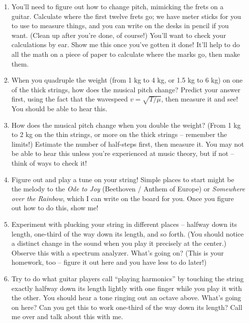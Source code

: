 \documentclass[12pt]{article}
\begin{document}
\begin{enumerate}


\item You'll need to figure out how to change pitch, mimicking the frets on a guitar. Calculate where the first twelve frets go; we have meter sticks for you to use
to measure things, and you can write on the desks in pencil if you want. (Clean up after you're done, of course!) You'll want to check your calculations by ear.
Show me this once you've gotten it done! It'll help to do all the math on a piece of paper to calculate where the marks go, then make them.


\item When you quadruple the weight (from 1 kg to 4 kg, or 1.5 kg to 6 kg) on one of the thick strings, how does the musical pitch change? Predict your answer first,
using the fact that the wavespeed $v=\sqrt{T/\mu}$, then measure it and see! You should be able to hear this.


\item How does the musical pitch change when you double the weight? (From 1 kg to 2 kg on the thin strings, or more on the thick strings -- remember the limits!)
Estimate the number of half-steps first, then measure it. You may not be able to hear this unless you're experienced at music theory, but if not -- think of ways to
check it!

\item Figure out and play a tune on your string! Simple places to start might be the melody to the {\it Ode to Joy} (Beethoven / Anthem of Europe) or 
{\it Somewhere over the Rainbow}, which I can write on the board for you. Once you figure out how to do this, show me!

\item Experiment with plucking your string in different places -- halfway down its length, one-third of the way down its length, and so forth. (You should notice
a distinct change in the sound when you play it precisely at the center.) Observe this with a spectrum analyzer. What's going on? (This is your homework, too -- 
figure it out here and you have less to do later!)

\item Try to do what guitar players call ``playing harmonics'' by touching the string exactly halfway down its length lightly with one finger while you play
it with the other. You should hear a tone ringing out an octave above. What's going on here? Can you get this to work one-third of the way down its length?
Call me over and talk about this with me.


\end{enumerate}
\end{document}
